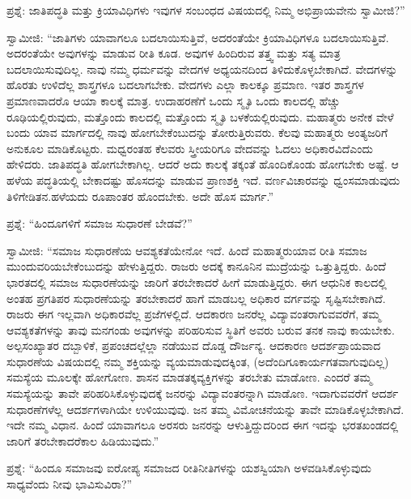 ಪ್ರಶ್ನೆ: ಜಾತಿಪದ್ಧತಿ ಮತ್ತು ಕ್ರಿಯಾವಿಧಿಗಳು ಇವುಗಳ ಸಂಬಂಧದ ವಿಷಯದಲ್ಲಿ ನಿಮ್ಮ ಅಭಿಪ್ರಾಯವೇನು ಸ್ವಾಮೀಜಿ?”

ಸ್ವಾಮೀಜಿ: “ಜಾತಿಗಳು ಯಾವಾಗಲೂ ಬದಲಾಯಿಸುತ್ತಿವೆ, ಅದರಂತೆಯೇ ಕ್ರಿಯಾವಿಧಿಗಳೂ ಬದಲಾಯಿಸುತ್ತಿವೆ. ಅದರಂತೆಯೇ ಅವುಗಳನ್ನು ಮಾಡುವ ರೀತಿ ಕೂಡ. ಅವುಗಳ ಹಿಂದಿರುವ ತತ್ತ್ವ ಮತ್ತು ಸತ್ಯ ಮಾತ್ರ ಬದಲಾಯಿಸುವುದಿಲ್ಲ. ನಾವು ನಮ್ಮ ಧರ್ಮವನ್ನು ವೇದಗಳ ಅಧ್ಯಯನದಿಂದ ತಿಳಿದುಕೊಳ್ಳಬೇಕಾಗಿದೆ. ವೇದಗಳನ್ನು ಹೊರತು ಉಳಿದೆಲ್ಲ ಶಾಸ್ತ್ರಗಳೂ ಬದಲಾಗಬೇಕು. ವೇದಗಳು ಎಲ್ಲಾ ಕಾಲಕ್ಕೂ ಪ್ರಮಾಣ. ಇತರ ಶಾಸ್ತ್ರಗಳ ಪ್ರಮಾಣವಾದರೊ ಆಯಾ ಕಾಲಕ್ಕೆ ಮಾತ್ರ. ಉದಾಹರಣೆಗೆ ಒಂದು ಸ್ಮೃತಿ ಒಂದು ಕಾಲದಲ್ಲಿ ಹೆಚ್ಚು ರೂಢಿಯಲ್ಲಿರುವುದು, ಮತ್ತೊಂದು ಕಾಲದಲ್ಲಿ ಮತ್ತೊಂದು ಸ್ಮೃತಿ ಬಳಕೆಯಲ್ಲಿರುವುದು. ಮಹಾತ್ಮರು ಅನೇಕ ವೇಳೆ ಬಂದು ಯಾವ ಮಾರ್ಗದಲ್ಲಿ ನಾವು ಹೋಗಬೇಕೆಂಬುದನ್ನು ತೋರುತ್ತಿರುವರು. ಕೆಲವು ಮಹಾತ್ಮರು ಅಂತ್ಯಜರಿಗೆ ಅನುಕೂಲ ಮಾಡಿಕೊಟ್ಟರು. ಮಧ್ವರಂತಹ ಕೆಲವರು ಸ್ತ್ರೀಯರಿಗೂ ವೇದವನ್ನು ಓದಲು ಅಧಿಕಾರವಿದೆ\break ಎಂದು ಹೇಳಿದರು. ಜಾತಿಪದ್ಧತಿ ಹೋಗಬೇಕಾಗಿಲ್ಲ. ಆದರೆ ಅದು ಕಾಲಕ್ಕೆ ತಕ್ಕಂತೆ ಹೊಂದಿಕೊಂಡು ಹೋಗಬೇಕು ಅಷ್ಟೆ. ಆ ಹಳೆಯ ಪದ್ಧತಿಯಲ್ಲಿ ಬೇಕಾದಷ್ಟು ಹೊಸದನ್ನು ಮಾಡುವ ಪ್ರಾಣಶಕ್ತಿ ಇದೆ. ವರ್ಣವಿಚಾರವನ್ನು ಧ್ವಂಸಮಾಡುವುದು ತಿಳಿಗೇಡಿತನ.\break ಹಳೆಯದು ರೂಪಾಂತರ ಹೊಂದಬೇಕು. ಅದೇ ಹೊಸ ಮಾರ್ಗ.”

ಪ್ರಶ್ನೆ: “ಹಿಂದೂಗಳಿಗೆ ಸಮಾಜ ಸುಧಾರಣೆ ಬೇಡವೆ?”

ಸ್ವಾಮೀಜಿ: “ಸಮಾಜ ಸುಧಾರಣೆಯ ಆವಶ್ಯಕತೆಯೇನೋ ಇದೆ. ಹಿಂದೆ ಮಹಾತ್ಮರು\break ಯಾವ ರೀತಿ ಸಮಾಜ ಮುಂದುವರಿಯಬೇಕೆಂಬುದನ್ನು ಹೇಳುತ್ತಿದ್ದರು. ರಾಜರು ಅದಕ್ಕೆ ಕಾನೂನಿನ ಮುದ್ರೆಯನ್ನು ಒತ್ತುತ್ತಿದ್ದರು. ಹಿಂದೆ ಭಾರತದಲ್ಲಿ ಸಮಾಜ ಸುಧಾರಣೆಯನ್ನು ಜಾರಿಗೆ ತರಬೇಕಾದರೆ ಹೀಗೆ ಮಾಡುತ್ತಿದ್ದರು. ಈಗ ಆಧುನಿಕ ಕಾಲದಲ್ಲಿ ಅಂತಹ ಪ್ರಗತಿಪರ ಸುಧಾರಣೆಯನ್ನು ತರಬೇಕಾದರೆ ಹಾಗೆ ಮಾಡಬಲ್ಲ ಅಧಿಕಾರ ವರ್ಗವನ್ನು ಸೃಷ್ಟಿಸಬೇಕಾಗಿದೆ. ರಾಜರು ಈಗ ಇಲ್ಲವಾಗಿ ಅಧಿಕಾರವೆಲ್ಲ ಪ್ರಜೆಗಳಲ್ಲಿದೆ. ಆದಕಾರಣ ಜನರೆಲ್ಲ ವಿದ್ಯಾವಂತರಾಗುವವರೆಗೆ, ತಮ್ಮ ಆವಶ್ಯಕತೆಗಳನ್ನು ತಾವು ಮನಗಂಡು ಅವುಗಳನ್ನು ಪರಿಹರಿಸುವ ಸ್ಥಿತಿಗೆ ಅವರು ಬರುವ ತನಕ ನಾವು ಕಾಯಬೇಕು. ಅಲ್ಪಸಂಖ್ಯಾತರ ದಬ್ಬಾಳಿಕೆ, ಪ್ರಪಂಚದಲ್ಲೆಲ್ಲಾ ನಡೆಯುವ ದೊಡ್ಡ ದೌರ್ಜನ್ಯ. ಆದಕಾರಣ ಆದರ್ಶಪ್ರಾಯವಾದ ಸುಧಾರಣೆಯ ವಿಷಯದಲ್ಲಿ ನಮ್ಮ ಶಕ್ತಿಯನ್ನು ವ್ಯಯಮಾಡುವುದಕ್ಕಿಂತ, (ಅದೆಂದಿಗೂ\break ಕಾರ್ಯಗತವಾಗುವುದಿಲ್ಲ) ಸಮಸ್ಯೆಯ ಮೂಲಕ್ಕೇ ಹೋಗೋಣ. ಶಾಸನ ಮಾಡತಕ್ಕ\break ವ್ಯಕ್ತಿಗಳನ್ನು ತರಬೇತು ಮಾಡೋಣ. ಎಂದರೆ ತಮ್ಮ ಸಮಸ್ಯೆಯನ್ನು ತಾವೇ ಪರಿಹರಿಸಿಕೊಳ್ಳುವುದಕ್ಕೆ ಜನರನ್ನು ವಿದ್ಯಾವಂತರನ್ನಾಗಿ ಮಾಡೊಣ. ಇದಾಗುವವರೆಗೆ ಆದರ್ಶ ಸುಧಾರಣೆಗಳೆಲ್ಲ ಆದರ್ಶಗಳಾಗಿಯೇ ಉಳಿಯುವುವು. ಜನ ತಮ್ಮ ವಿಮೋಚನೆಯನ್ನು ತಾವೇ ಮಾಡಿಕೊಳ್ಳಬೇಕಾಗಿದೆ. ಇದೇ ನಮ್ಮ ವಿಧಾನ. ಹಿಂದೆ ಯಾವಾಗಲೂ ಅರಸರು ಜನರನ್ನು ಆಳುತ್ತಿದ್ದುದರಿಂದ ಈಗ ಇದನ್ನು ಭರತಖಂಡದಲ್ಲಿ ಜಾರಿಗೆ ತರಬೇಕಾದರೆ\break ಕಾಲ ಹಿಡಿಯುವುದು.”

\vskip 0.1cm

ಪ್ರಶ್ನೆ: “ಹಿಂದೂ ಸಮಾಜವು ಐರೋಪ್ಯ ಸಮಾಜದ ರೀತಿನೀತಿಗಳನ್ನು ಯಶಸ್ವಿಯಾಗಿ ಅಳವಡಿಸಿಕೊಳ್ಳುವುದು ಸಾಧ್ಯವೆಂದು ನೀವು ಭಾವಿಸುವಿರಾ?”

\vskip 0.1cm

